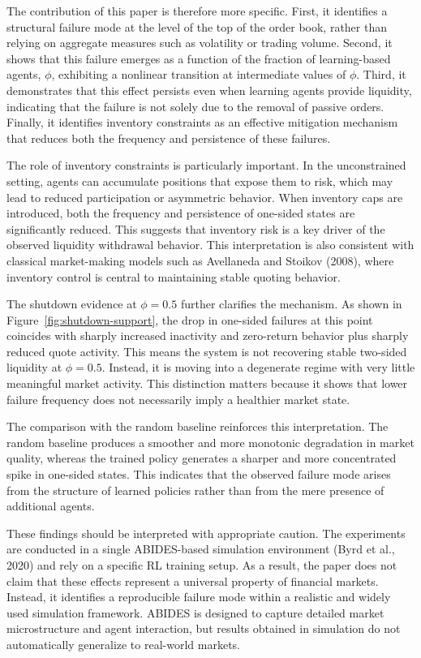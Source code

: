 \documentclass[sigconf]{acmart}
\begin{document}
The contribution of this paper is therefore more specific. First, it identifies a structural failure mode at the level of the top of the order book, rather than relying on aggregate measures such as volatility or trading volume. Second, it shows that this failure emerges as a function of the fraction of learning-based agents, $\phi$, exhibiting a nonlinear transition at intermediate values of $\phi$. Third, it demonstrates that this effect persists even when learning agents provide liquidity, indicating that the failure is not solely due to the removal of passive orders. Finally, it identifies inventory constraints as an effective mitigation mechanism that reduces both the frequency and persistence of these failures.

The role of inventory constraints is particularly important. In the unconstrained setting, agents can accumulate positions that expose them to risk, which may lead to reduced participation or asymmetric behavior. When inventory caps are introduced, both the frequency and persistence of one-sided states are significantly reduced. This suggests that inventory risk is a key driver of the observed liquidity withdrawal behavior. This interpretation is also consistent with classical market-making models such as Avellaneda and Stoikov (2008), where inventory control is central to maintaining stable quoting behavior.

The shutdown evidence at $\phi = 0.5$ further clarifies the mechanism. As shown in Figure~\ref{fig:shutdown-support}, the drop in one-sided failures at this point coincides with sharply increased inactivity and zero-return behavior plus sharply reduced quote activity. This means the system is not recovering stable two-sided liquidity at $\phi = 0.5$. Instead, it is moving into a degenerate regime with very little meaningful market activity. This distinction matters because it shows that lower failure frequency does not necessarily imply a healthier market state.

The comparison with the random baseline reinforces this interpretation. The random baseline produces a smoother and more monotonic degradation in market quality, whereas the trained policy generates a sharper and more concentrated spike in one-sided states. This indicates that the observed failure mode arises from the structure of learned policies rather than from the mere presence of additional agents.

These findings should be interpreted with appropriate caution. The experiments are conducted in a single ABIDES-based simulation environment (Byrd et al., 2020) and rely on a specific RL training setup. As a result, the paper does not claim that these effects represent a universal property of financial markets. Instead, it identifies a reproducible failure mode within a realistic and widely used simulation framework. ABIDES is designed to capture detailed market microstructure and agent interaction, but results obtained in simulation do not automatically generalize to real-world markets.
\end{document}
